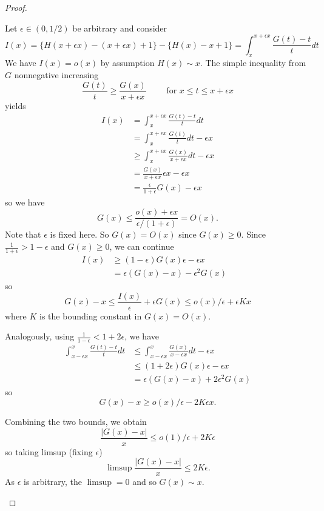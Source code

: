 \documentclass[12pt]{article}
\newcommand{\Abs}[1]{\left| #1 \right|}
\begin{document}
\begin{proof}
\begin{itemize}
Let $\epsilon \in (0, 1/2)$ be arbitrary and consider
$$I(x) = \{ H(x + \epsilon x) - ( x + \epsilon x) + 1 \} - \{ H(x) - x + 1\} = \int_x^{x + \epsilon x} \frac{G(t) - t}{t} dt$$
We have $I(x) = o(x)$ by assumption $H(x) \sim x$. The simple inequality from $G$ nonnegative increasing
$$\frac{G(t)}{t} \geq \frac{G(x)}{x + \epsilon x} \qquad \text{ for } x \leq t \leq x + \epsilon x$$
yields
\begin{align*}
I(x) &= \int_x^{x + \epsilon x} \frac{G(t) - t}{t} dt\\
&= \int_x^{x + \epsilon x} \frac{G(t)}{t} dt - \epsilon x\\
&\geq \int_x^{x + \epsilon x} \frac{G(x)}{x + \epsilon x} dt - \epsilon x\\
&= \frac{G(x)}{x + \epsilon x} \epsilon x - \epsilon x\\
&= \frac{\epsilon}{1 + \epsilon} G(x) - \epsilon x
\end{align*}
so we have
$$G(x) \leq \frac{o(x) + \epsilon x}{\epsilon / (1 + \epsilon)} = O(x).$$
Note that $\epsilon$ is fixed here. So $G(x) = O(x)$ since $G(x) \geq 0$.
Since $\frac{1}{1 + \epsilon} > 1 - \epsilon$ and $G(x) \geq 0$, we can continue 
\begin{align*}
I(x) &\geq (1 - \epsilon) G(x) \epsilon - \epsilon x &\\
&= \epsilon (G(x) - x) - \epsilon^2 G(x)
\end{align*}
so
$$G(x) - x \leq \frac{I(x)}{\epsilon} + \epsilon G(x) \leq o(x)/\epsilon + \epsilon K x$$
where $K$ is the bounding constant in $G(x) = O(x)$.

Analogously, using $\frac{1}{1-\epsilon} < 1 + 2\epsilon$, we have
\begin{align*}
\int_{x - \epsilon x}^{x} \frac{G(t) - t}{t} dt 
&\leq \int_{x - \epsilon x}^{x} \frac{G(x)}{x - \epsilon x} dt - \epsilon x\\
&\leq (1 + 2\epsilon) G(x) \epsilon - \epsilon x\\
&= \epsilon (G(x) - x) + 2 \epsilon^2 G(x)
\end{align*}
so
$$G(x) - x \geq o(x) / \epsilon - 2 K \epsilon x.$$

Combining the two bounds, we obtain
$$\frac{\Abs{ G(x) - x }}{x} \leq o(1) / \epsilon + 2 K \epsilon$$
so taking limsup (fixing $\epsilon$)
$$\limsup \frac{\Abs{ G(x) - x }}{x} \leq 2 K \epsilon.$$
As $\epsilon$ is arbitrary, the $\limsup = 0$ and so $G(x) \sim x$.
\end{itemize}
\end{proof}

\unless\ifdefined\IsMainDocument
\end{document}
